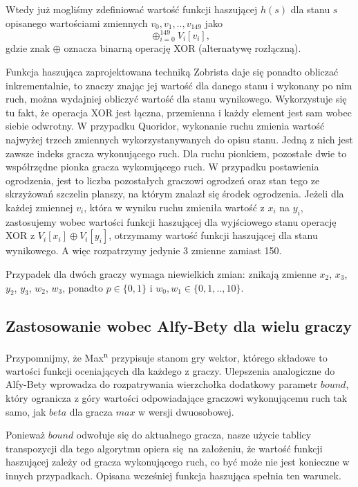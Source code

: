 \documentclass{pracamgr}
\begin{document}
Wtedy już mogliśmy zdefiniować wartość funkcji haszującej \(h(s)\) dla stanu \(s\) opisanego wartościami zmiennych \(v_0, v_1, .., v_{149}\) jako \[\oplus_{i = 0}^{149} V_i[v_i]\text{,}\] gdzie znak \(\oplus\) oznacza binarną operację XOR (alternatywę rozłączną).

Funkcja haszująca zaprojektowana techniką Zobrista daje się ponadto obliczać inkrementalnie, to znaczy znając jej wartość dla danego stanu i wykonany po nim ruch, można wydajniej obliczyć wartość dla stanu wynikowego.
Wykorzystuje się tu fakt, że operacja XOR jest łączna, przemienna i każdy element jest sam wobec siebie odwrotny.
W przypadku Quoridor, wykonanie ruchu zmienia wartość najwyżej trzech zmiennych wykorzystanywanych do opisu stanu.
Jedną z nich jest zawsze indeks gracza wykonującego ruch.
Dla ruchu pionkiem, pozostałe dwie to współrzędne pionka gracza wykonującego ruch.
W przypadku postawienia ogrodzenia, jest to liczba pozostałych graczowi ogrodzeń oraz stan tego ze skrzyżowań szczelin planszy, na którym znalazł się środek ogrodzenia.
Jeżeli dla każdej zmiennej \(v_i\), która w wyniku ruchu zmieniła wartość z \(x_i\) na \(y_i\), zastosujemy wobec wartości funkcji haszującej dla wyjściowego stanu operację XOR z \(V_i[x_i] \oplus V_i[y_i]\), otrzymamy wartość funkcji haszującej dla stanu wynikowego.
A więc rozpatrzymy jedynie 3 zmienne zamiast 150.

Przypadek dla dwóch graczy wymaga niewielkich zmian: znikają zmienne \(x_2\), \(x_3\), \(y_2\), \(y_3\), \(w_2\), \(w_3\), ponadto \(p \in \{0, 1\}\) i \(w_0, w_1 \in \{0, 1, .., 10\}\).

\subsection{Zastosowanie wobec Alfy-Bety dla wielu graczy}

Przypomnijmy, że Max\textsuperscript{n} przypisuje stanom gry wektor, którego składowe to wartości funkcji oceniających dla każdego z graczy.
Ulepszenia analogiczne do Alfy-Bety wprowadza do rozpatrywania wierzchołka dodatkowy parametr \(bound\), który ogranicza z góry wartości odpowiadające graczowi wykonującemu ruch tak samo, jak \(beta\) dla gracza \(max\) w wersji dwuosobowej.

Ponieważ \(bound\) odwołuje się do aktualnego gracza, nasze użycie tablicy transpozycji dla tego algorytmu opiera się na założeniu, że wartość funkcji haszującej zależy od gracza wykonującego ruch, co być może nie jest konieczne w innych przypadkach.
Opisana wcześniej funkcja haszująca spełnia ten warunek.
\end{document}
